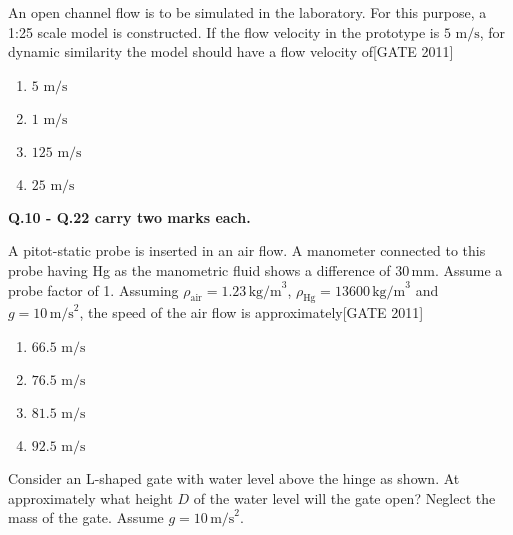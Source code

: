     \item An open channel flow is to be simulated in the laboratory. For this purpose, a 1:25 scale model is constructed. If the flow velocity in the prototype is $5  \text{ m/s}$, for dynamic similarity the model should have a flow velocity of\hfill{[GATE 2011]}
    \begin{multicols}{4}
    \begin{enumerate}
        \item $5  \text{ m/s}$
        \item $1  \text{ m/s}$
        \item $125  \text{ m/s}$
        \item $25  \text{ m/s}$
    \end{enumerate}
    \end{multicols}

\textbf{Q.10 - Q.22 carry two marks each.}

\item A pitot-static probe is inserted in an air flow. A manometer connected to this probe having Hg as the manometric fluid shows a difference of $30 \, \text{mm}$. Assume a probe factor of 1. Assuming $\rho_{\text{air}} = 1.23 \, \text{kg/m}^3$, $\rho_{\text{Hg}} = 13600 \, \text{kg/m}^3$ and $g = 10 \, \text{m/s}^2$, the speed of the air flow is approximately\hfill{[GATE 2011]}
  \begin{multicols}{4}
    \begin{enumerate}
        \item $66.5 \text{ m/s}$
        \item $76.5 \text{ m/s}$
        \item $81.5 \text{ m/s}$
        \item $92.5 \text{ m/s}$
    \end{enumerate}
    \end{multicols}

\item Consider an L-shaped gate with water level above the hinge as shown. At approximately what height $D$ of the water level will the gate open? Neglect the mass of the gate. Assume $g = 10 \, \text{m/s}^2$.

